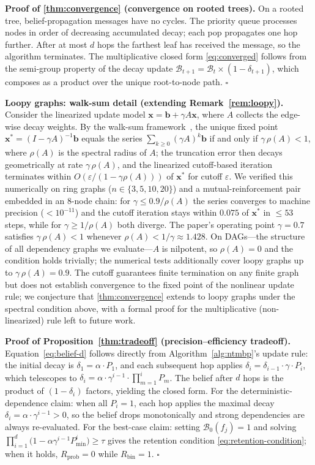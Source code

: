 \documentclass{article}
\theoremstyle{definition}
\begin{document}
\textbf{Proof of \cref{thm:convergence} (convergence on rooted trees).}
On a rooted tree, belief-propagation messages have no cycles.  The
priority queue processes nodes in order of decreasing accumulated decay;
each pop propagates one hop further.  After at most $d$ hops the farthest leaf
has received the message, so the algorithm terminates.  The multiplicative
closed form \eqref{eq:converged} follows from the semi-group property of
the decay update $\mathcal{B}_{t+1}=\mathcal{B}_t\times(1-\delta_{t+1})$,
which composes as a product over the unique root-to-node path.
\hfill$\square$

\textbf{Loopy graphs: walk-sum detail (extending Remark~\ref{rem:loopy}).}
Consider the linearized update model
$\mathbf{x}=\mathbf{b}+\gamma A\mathbf{x}$, where $A$ collects the
edge-wise decay weights.  By the walk-sum
framework~\cite{malioutov2006walksum}, the unique fixed point
$\mathbf{x}^*=(I-\gamma A)^{-1}\mathbf{b}$ equals the series
$\sum_{k\ge0}(\gamma A)^k\mathbf{b}$ if and only if $\gamma\,\rho(A)<1$,
where $\rho(A)$ is the spectral radius of $A$; the truncation error then
decays geometrically at rate $\gamma\,\rho(A)$, and
the linearized cutoff-based iteration terminates within
$O(\varepsilon/(1-\gamma\rho(A)))$ of $\mathbf{x}^*$ for cutoff
$\varepsilon$.  We verified this numerically on ring graphs
($n\in\{3,5,10,20\}$) and a mutual-reinforcement pair embedded in an
8-node chain: for $\gamma\le0.9/\rho(A)$ the series converges to machine
precision ($<10^{-11}$) and the cutoff iteration stays within $0.075$ of
$\mathbf{x}^*$ in $\le53$ steps, while for $\gamma\ge1/\rho(A)$ both
diverge.  The paper's operating point $\gamma=0.7$ satisfies
$\gamma\,\rho(A)<1$ whenever $\rho(A)<1/\gamma\approx1.428$.  On DAGs---the structure of
all dependency graphs we evaluate---$A$ is nilpotent, so $\rho(A)=0$ and
the condition holds trivially; the numerical tests additionally cover
loopy graphs up to $\gamma\,\rho(A)=0.9$.  The cutoff guarantees finite
termination on any finite graph but does not establish convergence to the
fixed point of the nonlinear update rule; we conjecture that
\cref{thm:convergence} extends to loopy graphs under the spectral
condition above, with a formal proof for the multiplicative
(non-linearized) rule left to future work.

\textbf{Proof of Proposition~\ref{thm:tradeoff} (precision--efficiency tradeoff).}
Equation~\eqref{eq:belief-d} follows directly from
Algorithm~\ref{alg:ntmbp}'s update
rule: the initial decay is $\delta_1=\alpha\cdot P_1$, and each subsequent
hop applies $\delta_i=\delta_{i-1}\cdot\gamma\cdot P_i$, which telescopes
to $\delta_i=\alpha\cdot\gamma^{i-1}\cdot\prod_{m=1}^{i}P_m$.  The belief
after $d$ hops is the product of $(1-\delta_i)$ factors, yielding the
closed form.  For the deterministic-dependence claim: when all $P_i=1$,
each hop applies the maximal decay $\delta_i=\alpha\cdot\gamma^{i-1}>0$,
so the belief drops monotonically and strong dependencies are always
re-evaluated.  For the best-case claim: setting $\mathcal{B}_0(f_j)=1$
and solving $\prod_{i=1}^{d}\big(1-\alpha\gamma^{i-1}P_{\min}^{i}\big)\geq\tau$
gives the retention condition \eqref{eq:retention-condition}; when it
holds, $R_{\text{prob}}=0$ while $R_{\text{bin}}=1$.
\hfill$\square$
\end{document}
